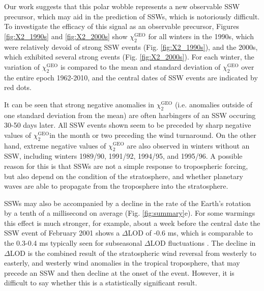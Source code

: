 \documentclass[draft,jgrga]{agutex}
\begin{document}
\begin{article}
Our work suggests that this polar wobble represents a new observable SSW precursor, which  may aid in the prediction of SSWs, which is notoriously difficult.
 {To investigate the efficacy of this signal as an observable precursor, Figures} \ref{fig:X2_1990s} and \ref{fig:X2_2000s}  {show $\chi_2^{\text{GEO}}$ for all winters in the 1990s, which were relatively devoid of strong SSW events} (Fig. \ref{fig:X2_1990s}),  {and the 2000s, which exhibited several strong events} (Fig. \ref{fig:X2_2000s}).
 {For each winter, the variation of $\chi_2^{\text{GEO}}$ is compared to the mean and standard deviation of $\chi_2^{\text{GEO}}$ over the entire epoch 1962-2010, and the central dates of SSW events are indicated by red dots.}

 {It can be seen that strong negative anomalies in $\chi_2^{\text{GEO}}$ (i.e. anomalies outside of one standard deviation from the mean) are often harbingers of an SSW occuring 30-50 days later.
All SSW events shown seem to be preceded by sharp negative values of $\chi_2^{\text{GEO}}$in the month or two preceding the wind turnaround.
On the other hand, extreme negative values of $\chi_2^{\text{GEO}}$ are also observed in winters without an SSW, including winters 1989/90, 1991/92, 1994/95, and 1995/96.
A possible reason for this is that SSWs are not a simple response to tropospheric forcing, but also depend on the condition of the stratosphere, and whether planetary waves are able to propagate from the troposphere into the stratosphere. }


SSWs may also be accompanied by a decline in the rate of the Earth's rotation by a tenth of a millisecond on average (Fig. \ref{fig:summary}e).
For some warmings this effect is much stronger, for example, about a week before the central date the SSW event of February 2001 shows a $\Delta$LOD of -0.6 ms, which is comparable to the  0.3-0.4 ms typically seen for subseasonal $\Delta$LOD fluctuations \citep{eubanksetal1985,rosenetal1991}.
The decline in $\Delta$LOD is the combined result of the stratospheric wind reversal from westerly to easterly, and westerly wind anomalies  {in the tropical troposphere, that may precede an SSW and then decline at the onset of the event.  
However, it is difficult to say whether this is a statistically significant result}.


\end{article}
\end{document}
